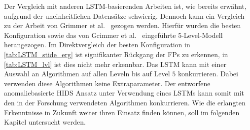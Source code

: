 Der Vergleich mit anderen \ac{LSTM}-basierenden Arbeiten ist, wie bereits erwähnt, aufgrund der uneinheitlichen Datensätze schwierig.
Dennoch kann ein Vergleich zu der Arbeit von Grimmer et al.~\cite{IDSTHREADGRIMMER2021} gezogen werden.
Hierfür wurden die besten Konfiguration sowie das von Grimmer et al.~\cite{IDSTHREADGRIMMER2021} eingeführte 5-Level-Modell herangezogen.
Im Direktvergleich der besten Konfiguration in \autoref{tab:LSTM_stide_erg} ist signifikanter Rückgang der \acp{FP} zu erkennen, in \autoref{tab:LSTM_lvl} ist dies nicht mehr erkennbar.
Das \ac{LSTM} kann mit einer Auswahl an Algorithmen auf allen Leveln bis auf Level $5$ konkurrieren.
Dabei verwenden diese Algorithmen keine Extraparameter.
Der entworfene anomaliebasierte \ac{HIDS} Ansatz unter Verwendung eines \acp{LSTM} kann somit mit den in der Forschung verwendeten Algorithmen konkurrieren.
Wie die erlangten Erkenntnisse in Zukunft weiter ihren Einsatz finden können, soll im folgenden Kapitel untersucht werden.
